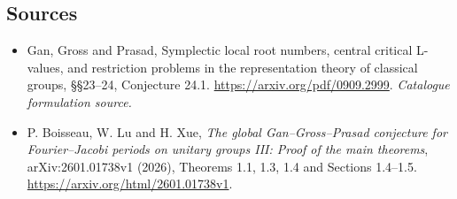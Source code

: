 \documentclass[11pt,a4paper]{article}
\numberwithin{equation}{section}
\begin{document}
\subsection{Sources}
\begin{itemize}\raggedright
\item[\textnormal{[S1]}]\hypertarget{source:statement:1}{} Gan, Gross and Prasad, Symplectic local root numbers, central critical L-values, and restriction problems in the representation theory of classical groups, §§23–24, Conjecture 24.1.
\url{https://arxiv.org/pdf/0909.2999}.
{\small\textit{Catalogue formulation source.}}
\item[\textnormal{[E1]}]\hypertarget{extra:statement:1}{} P. Boisseau, W. Lu and H. Xue,
\emph{The global Gan--Gross--Prasad conjecture for Fourier--Jacobi periods
on unitary groups III: Proof of the main theorems}, arXiv:2601.01738v1
(2026), Theorems 1.1, 1.3, 1.4 and Sections 1.4--1.5.
\url{https://arxiv.org/html/2601.01738v1}.

\end{itemize}
\end{document}
